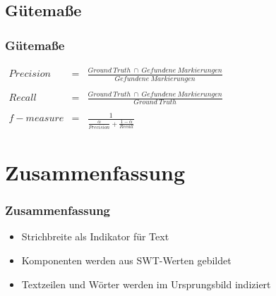 \documentclass[9pt]{beamer}
\begin{document}
		\subsection{Gütemaße}
		\begin{frame}
			\frametitle{Gütemaße}
			$
		    \begin{array}{lcl}
				Precision & = & \frac{Ground\:Truth \:\cap\: Gefundene\:Markierungen}{Gefundene\:Markierungen} \\
				\\
				Recall & = & \frac{Ground\:Truth \:\cap\: Gefundene\:Markierungen}{Ground\:Truth} \\
				\\
				f-measure & = & \frac{1}{\frac{\alpha}{Precision}+\frac{1-\alpha}{Recall}}
			\end{array}
			$
		\end{frame}
	
	\section{Zusammenfassung}
		\begin{frame}
			\frametitle{Zusammenfassung}
			\begin{itemize}
				\item Strichbreite als Indikator für Text
				\item Komponenten werden aus SWT-Werten gebildet
				\item Textzeilen und Wörter werden im Ursprungsbild indiziert
			\end{itemize}
			
		\end{frame}
\end{document}
